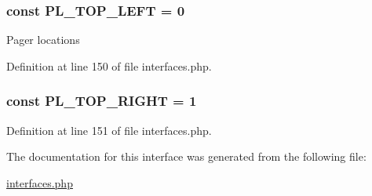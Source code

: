 \hypertarget{interfaceIXLUIHelper_ac77237b0fcb9d6540fca4eb80f4487f8}{
\subsubsection[{PL\_\-TOP\_\-LEFT}]{\setlength{\rightskip}{0pt plus 5cm}const {\bf PL\_\-TOP\_\-LEFT} = 0}}
\label{interfaceIXLUIHelper_ac77237b0fcb9d6540fca4eb80f4487f8}
Pager locations 

Definition at line 150 of file interfaces.php.

\hypertarget{interfaceIXLUIHelper_ab2d49310ee456748bb800d490fcc9e89}{
\subsubsection[{PL\_\-TOP\_\-RIGHT}]{\setlength{\rightskip}{0pt plus 5cm}const {\bf PL\_\-TOP\_\-RIGHT} = 1}}
\label{interfaceIXLUIHelper_ab2d49310ee456748bb800d490fcc9e89}


Definition at line 151 of file interfaces.php.



The documentation for this interface was generated from the following file:\begin{DoxyCompactItemize}
\item 
\hyperlink{interfaces_8php}{interfaces.php}\end{DoxyCompactItemize}
